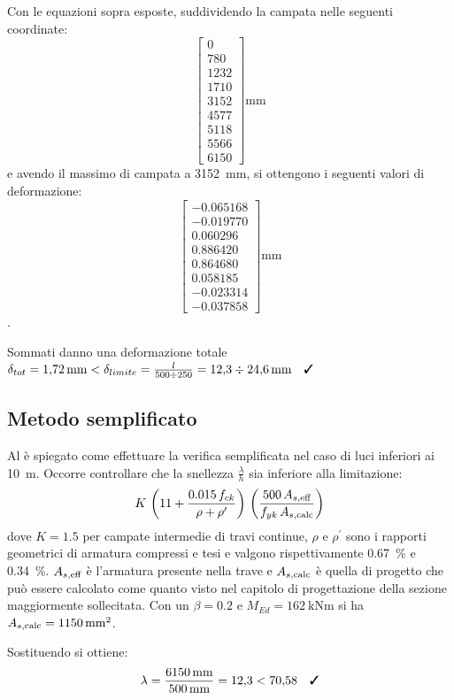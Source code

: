 Con le equazioni sopra esposte, suddividendo la campata nelle seguenti coordinate: 
\[
    \begin{bmatrix}
        0\\  780\\ 1232\\ 1710\\ 3152\\ 4577\\ 5118\\ 5566\\ 6150
    \end{bmatrix}    
    \si{\milli\metre}
\] 
e avendo il massimo di campata a \SI{3152}{\milli\metre}, si ottengono i seguenti valori di deformazione:
\[
    \begin{bmatrix}
        -0.065168\\ -0.019770\\ 0.060296\\ 0.886420\\ 0.864680\\ 0.058185\\ -0.023314\\ -0.037858
    \end{bmatrix}    
    \si{\milli\metre}
\].

Sommati danno una deformazione totale $\delta_{tot} = \SI{1.72}{\milli\metre} <\delta_{limite} = \frac{l}{500\div 250} = \num{12.3} \div \SI{24.6}{\milli\metre} \quad\checked$ 

\subsection{Metodo semplificato}
Al  è spiegato come effettuare la verifica semplificata nel caso di luci inferiori ai \SI{10}{\metre}.
Occorre controllare che la snellezza $\frac{\lambda}{h}$ sia inferiore alla limitazione:
\begin{equation}
    K  \, \left( 11 + \frac{0.015\,f_{ck}}{\rho + \rho^\prime}\right) \, \left( \frac{500 \, A_{s, \textup{eff}}}{f_{yk} \, A_{s, \textup{calc}}} \right)
\end{equation}
dove $K = 1.5$ per campate intermedie di travi continue, $\rho$ e $\rho^\prime$ sono i rapporti geometrici di armatura compressi e tesi e valgono rispettivamente \SI{0.67}{\percent} e \SI{0.34}{\percent}.
$A_{s, \textup{eff}}$ è l'armatura presente nella trave e $A_{s, \textup{calc}}$ è quella di progetto che può essere calcolato come quanto visto nel capitolo di progettazione della sezione maggiormente sollecitata. 
Con un $\beta = 0.2$ e $M_{Ed} = \SI{162}{\kilo\newton\metre}$ si ha $A_{s, \textup{calc}} = \SI{1150}{\milli\metre\squared}$.

Sostituendo si ottiene:
\[
    \lambda = \frac{\SI{6150}{\milli\metre}}{\SI{500}{\milli\metre}} = \num{12.3} < \num{70.58} \quad \checked
\]